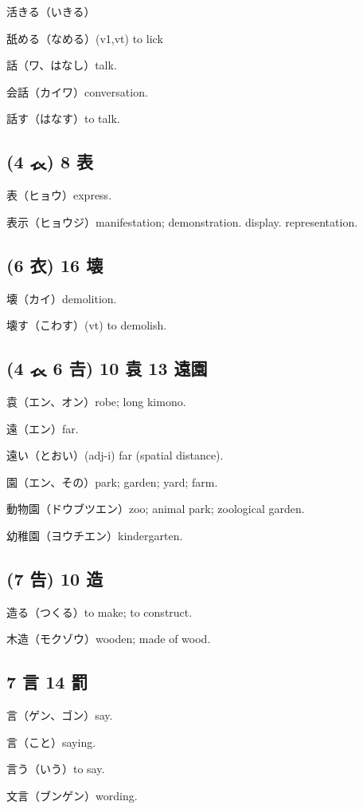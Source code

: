 活きる（いきる）

舐める（なめる）(v1,vt) to lick

話（ワ、はなし）talk.

会話（カイワ）conversation.

話す（はなす）to talk.

\subsection{(4 𧘇) 8 表}

表（ヒョウ）express.

表示（ヒョウジ）manifestation; demonstration. display. representation.

\subsection{(6 衣) 16 壊}

壊（カイ）demolition.

壊す（こわす）(vt) to demolish.

\subsection{(4 𧘇 6 𠮷) 10 袁 13 遠園}

袁（エン、オン）robe; long kimono.

遠（エン）far.

遠い（とおい）(adj-i) far (spatial distance).

園（エン、その）park; garden; yard; farm.

動物園（ドウブツエン）zoo; animal park; zoological garden.

幼稚園（ヨウチエン）kindergarten.

\subsection{(7 告) 10 造}

造る（つくる）to make; to construct.

木造（モクゾウ）wooden; made of wood.

\subsection{7 言 14 罰}

言（ゲン、ゴン）say.

言（こと）saying.

言う（いう）to say.

文言（ブンゲン）wording.

